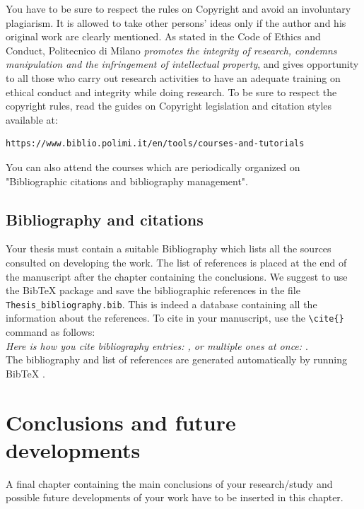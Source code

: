 \documentclass{config/PoliMi3i_thesis}
\begin{document}
You have to be sure to respect the rules on Copyright and avoid an involuntary plagiarism.
It is allowed to take other persons' ideas only if the author and his original work are clearly mentioned.
As stated in the Code of Ethics and Conduct, Politecnico di Milano \textit{promotes the integrity of research,
    condemns manipulation and the infringement of intellectual property}, and gives opportunity to all those
who carry out research activities to have an adequate training on ethical conduct and integrity while doing research.
To be sure to respect the copyright rules, read the guides on Copyright legislation and citation styles available
at:
\begin{verbatim}
https://www.biblio.polimi.it/en/tools/courses-and-tutorials
\end{verbatim}
You can also attend the courses which are periodically organized on "Bibliographic citations and bibliography management".

\section{Bibliography and citations}
Your thesis must contain a suitable Bibliography which lists all the sources consulted on developing the work.
The list of references is placed at the end of the manuscript after the chapter containing the conclusions.
We suggest to use the BibTeX package and save the bibliographic references  in the file \verb|Thesis_bibliography.bib|.
This is indeed a database containing all the information about the references. To cite in your manuscript, use the \verb|\cite{}| command as follows:
\\
\textit{Here is how you cite bibliography entries: \cite{knuth74}, or multiple ones at once: \cite{knuth92,lamport94}}.
\\
The bibliography and list of references are generated automatically by running BibTeX \cite{bibtex}.

\chapter{Conclusions and future developments}
\label{ch:conclusions}%
A final chapter containing the main conclusions of your research/study
and possible future developments of your work have to be inserted in this chapter.

\end{document}
